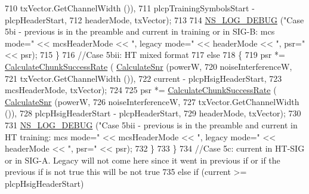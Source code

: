 \begin{DoxyCode}
710                                                                   txVector.GetChannelWidth ()),
711                                                     plcpTrainingSymbolsStart - plcpHeaderStart,
712                                                     headerMode, txVector);
713 
714                   \hyperlink{group__logging_ga413f1886406d49f59a6a0a89b77b4d0a}{NS\_LOG\_DEBUG} (\textcolor{stringliteral}{"Case 5bi - previous is in the preamble and current in training
       or in SIG-B: mcs mode="} << mcsHeaderMode << \textcolor{stringliteral}{", legacy mode="} << headerMode << \textcolor{stringliteral}{", psr="} << psr);
715                 \}
716               \textcolor{comment}{//Case 5bii: HT mixed format}
717               \textcolor{keywordflow}{else}
718                 \{
719                   psr *= \hyperlink{classns3_1_1InterferenceHelper_ab1c34c3f7ecef1e37ec778c0cf0e9cef}{CalculateChunkSuccessRate} (
      \hyperlink{classns3_1_1InterferenceHelper_a8f6192d041874595004c007c5a519b4b}{CalculateSnr} (powerW,
720                                                                   noiseInterferenceW,
721                                                                   txVector.GetChannelWidth ()),
722                                                     current - plcpHsigHeaderStart,
723                                                     mcsHeaderMode, txVector);
724 
725                   psr *= \hyperlink{classns3_1_1InterferenceHelper_ab1c34c3f7ecef1e37ec778c0cf0e9cef}{CalculateChunkSuccessRate} (
      \hyperlink{classns3_1_1InterferenceHelper_a8f6192d041874595004c007c5a519b4b}{CalculateSnr} (powerW,
726                                                                   noiseInterferenceW,
727                                                                   txVector.GetChannelWidth ()),
728                                                     plcpHsigHeaderStart - plcpHeaderStart,
729                                                     headerMode, txVector);
730 
731                   \hyperlink{group__logging_ga413f1886406d49f59a6a0a89b77b4d0a}{NS\_LOG\_DEBUG} (\textcolor{stringliteral}{"Case 5bii - previous is in the preamble and current in HT
       training: mcs mode="} << mcsHeaderMode << \textcolor{stringliteral}{", legacy mode="} << headerMode << \textcolor{stringliteral}{", psr="} << psr);
732                 \}
733             \}
734           \textcolor{comment}{//Case 5c: current in HT-SIG or in SIG-A. Legacy will not come here since it went in previous if
       or if the previous if is not true this will be not true}
735           \textcolor{keywordflow}{else} \textcolor{keywordflow}{if} (current >= plcpHsigHeaderStart)

\end{DoxyCode}
